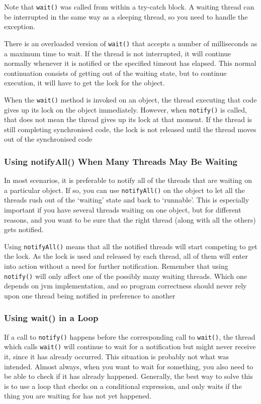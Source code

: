 Note that \verb#wait()# was called from within a try-catch block. A waiting 
thread can be interrupted in the same way as a sleeping thread, so you need to 
handle the exception.

There is an overloaded version of \verb#wait()# that accepts a number of 
milliseconds as a maximum time to wait. If the thread is not interrupted, it 
will continue normally whenever it is notified or the specified timeout has 
elapsed. This normal continuation consists of getting out of the waiting state, 
but to continue execution, it will have to get the lock for the object.

When the \verb#wait()# method is invoked on an object, the thread executing 
that code gives up its lock on the object immediately. However, when 
\verb#notify()# is called, that does not mean the thread gives up its lock at 
that moment. If the thread is still completing synchronised code, the lock is 
not released until the thread moves out of the synchronised code

\subsubsection{Using notifyAll() When Many Threads May Be Waiting}
In most scenarios, it is preferable to notify all of the threads that are 
waiting on a particular object. If so, you can use \verb#notifyAll()# on the 
object to let all the threads rush out of the `waiting' state and back to 
`runnable'. This is especially important if you have several threads waiting on 
one object, but for different reasons, and you want to be sure that the right 
thread (along with all the others) gets notified.

Using \verb#notifyAll()# means that all the notified threads will start 
competing to get the lock. As the lock is used and released by each thread, all 
of them will enter into action without a need for further notification.  
Remember that using \verb#notify()# will only affect one of the possibly many 
waiting threads. Which one depends on jvm implementation, and so program 
correctness should never rely upon one thread being notified in preference to 
another

\subsubsection{Using wait() in a Loop}
If a call to \verb#notify()# happens before the corresponding call to 
\verb#wait()#, the thread which calls \verb#wait()# will continue to wait for a 
notification but might never receive it, since it has already occurred. This 
situation is probably not what was intended. Almost always, when you want to 
wait for something, you also need to be able to check if it has already 
happened. Generally, the best way to solve this is to use a loop that checks on 
a conditional expression, and only waits if the thing you are waiting for has 
not yet happened.

